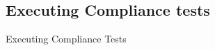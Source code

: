 \documentclass[aspectratio=169]{beamer}
\newcommand{\slidefont}{\scriptsize}
\begin{document}

\subsection{Executing Compliance tests}


\begin{frame}[fragile]

  \slidefont

  \vfill

  \begin{center}\LARGE
    Executing Compliance Tests
  \end{center}

  \vfill

\end{frame}

\end{document}
